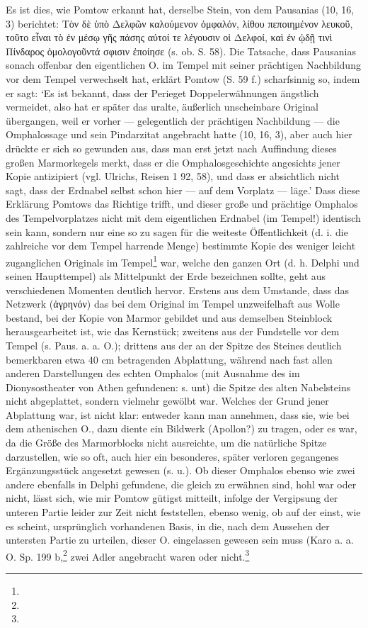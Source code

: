 \documentclass[a4paper, 11pt, oneside]{article}
\begin{document}
Es ist dies, wie Pomtow erkannt hat, derselbe Stein, von dem Pausanias (10, 16, 3) berichtet: Τὸν δὲ ὑπὸ Δελφῶν καλούμενον ὀμφαλόν, λίθου πεποιημένον λευκοῦ, τοῦτο εἶναι τὸ ἐν μέσῳ γῆς πάσης αὐτοί τε λέγουσιν οἱ Δελφοί, καὶ ἐν ᾠδῇ τινὶ Πίνδαρος ὁμολογοῦντά σφισιν ἐποίησε (s. ob. S. 58). Die Tatsache, dass Pausanias sonach offenbar den eigentlichen O. im Tempel mit seiner prächtigen Nachbildung vor dem Tempel verwechselt hat, erklärt Pomtow (S. 59 f.) scharfsinnig so, indem er sagt: `Es ist bekannt, dass der Perieget Doppelerwähnungen ängstlich vermeidet, also hat er später das uralte, äußerlich unscheinbare Original übergangen, weil er vorher --- gelegentlich der prächtigen Nachbildung --- die Omphalossage und sein Pindarzitat angebracht hatte (10, 16, 3), aber auch hier drückte er sich so gewunden aus, dass man erst jetzt nach Auffindung dieses großen Marmorkegels merkt, dass er die Omphalosgeschichte angesichts jener Kopie antizipiert (vgl. Ulrichs, Reisen 1 92, 58), und dass er absichtlich nicht sagt, dass der Erdnabel selbst schon hier --- auf dem Vorplatz --- läge.' Dass diese Erklärung Pomtows das Richtige trifft, und dieser große und prächtige Omphalos des Tempelvorplatzes nicht mit dem eigentlichen Erdnabel (im Tempel!) identisch sein kann, sondern nur eine so zu sagen für die weiteste Öffentlichkeit (d. i. die zahlreiche vor dem Tempel harrende Menge) bestimmte Kopie des weniger leicht zuganglichen Originals im Tempel\footnote{} war, welche den ganzen Ort (d. h. Delphi und seinen Haupttempel) als Mittelpunkt der Erde bezeichnen sollte, geht aus verschiedenen Momenten deutlich hervor. Erstens aus dem Umstande, dass das Netzwerk (ἀγρηνόν) das bei dem Original im Tempel unzweifelhaft aus Wolle bestand, bei der Kopie von Marmor gebildet und aus demselben Steinblock herausgearbeitet ist, wie das Kernstück; zweitens aus der Fundstelle vor dem Tempel (s. Paus. a. a. O.); drittens aus der an der Spitze des Steines deutlich bemerkbaren etwa 40 cm betragenden Abplattung, während nach fast allen anderen Darstellungen des echten Omphalos (mit Ausnahme des im Dionysostheater von Athen gefundenen: s. unt) die Spitze des alten Nabelsteins nicht abgeplattet, sondern vielmehr gewölbt war. Welches der Grund jener Abplattung war, ist nicht klar: entweder kann man annehmen, dass sie, wie bei dem athenischen O., dazu diente ein Bildwerk (Apollon?) zu tragen, oder es war, da die Größe des Marmorblocks nicht ausreichte, um die natürliche Spitze darzustellen, wie so oft, auch hier ein besonderes, später verloren gegangenes Ergänzungsstück angesetzt gewesen (s. u.). Ob dieser Omphalos ebenso wie zwei andere ebenfalls in Delphi gefundene, die gleich zu erwähnen sind, hohl war oder nicht, lässt sich, wie mir Pomtow gütigst mitteilt, infolge der Vergipsung der unteren Partie leider zur Zeit nicht feststellen, ebenso wenig, ob auf der einst, wie es scheint, ursprünglich vorhandenen Basis, in die, nach dem Aussehen der untersten Partie zu urteilen, dieser O. eingelassen gewesen sein muss (Karo a. a. O. Sp. 199 b,\footnote{} zwei Adler angebracht waren oder nicht.\footnote{}
\end{document}

